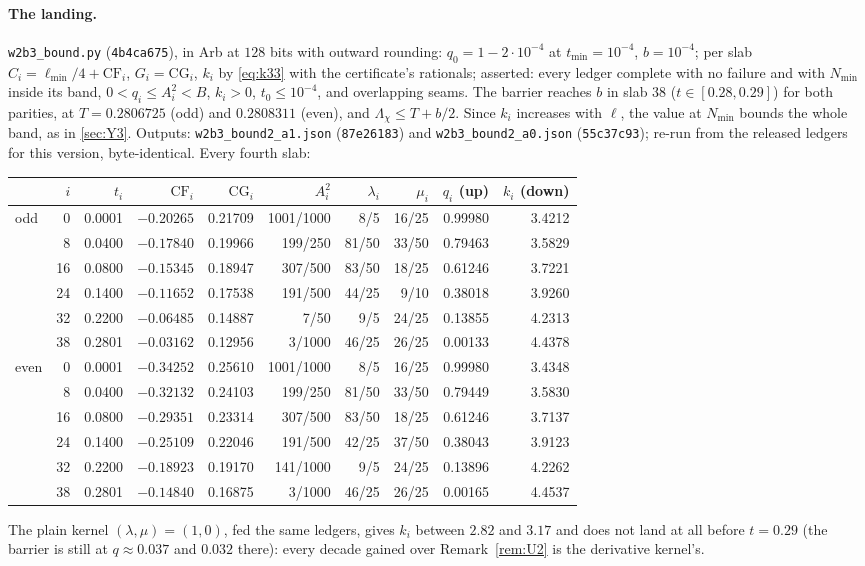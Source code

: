 \documentclass[11pt]{article}
\theoremstyle{definition}
\newcommand{\lean}[1]{\texttt{#1}}
\newcommand{\Lc}{\Lambda}
\begin{document}
\paragraph{The landing.} \lean{w2b3\_bound.py} (\lean{4b4ca675}), in Arb at $128$ bits with outward rounding: $q_0 = 1 - 2\cdot10^{-4}$ at $t_{\min} = 10^{-4}$, $b = 10^{-4}$; per slab $C_i = \ell_{\min}/4 + \mathrm{CF}_i$, $G_i = \mathrm{CG}_i$, $k_i$ by \eqref{eq:k33} with the certificate's rationals; asserted: every ledger complete with no failure and with $N_{\min}$ inside its band, $0 < q_i \le A_i^2 < B$, $k_i > 0$, $t_0 \le 10^{-4}$, and overlapping seams. The barrier reaches $b$ in slab $38$ ($t \in [0.28, 0.29]$) for both parities, at $T = 0.2806725$ (odd) and $0.2808311$ (even), and $\Lc_\chi \le T + b/2$. Since $k_i$ increases with $\ell$, the value at $N_{\min}$ bounds the whole band, as in \cref{sec:Y3}. Outputs: \lean{w2b3\_bound2\_a1.json} (\lean{87e26183}) and \lean{w2b3\_bound2\_a0.json} (\lean{55c37c93}); re-run from the released ledgers for this version, byte-identical. Every fourth slab:
\begin{center}\small
\begin{tabular}{@{}lrrrrrrrrr@{}}
\toprule
& $i$ & $t_i$ & $\mathrm{CF}_i$ & $\mathrm{CG}_i$ & $A_i^2$ & $\lambda_i$ & $\mu_i$ & $q_i$ (up) & $k_i$ (down) \\
\midrule
odd & 0 & 0.0001 & $-0.20265$ & 0.21709 & 1001/1000 & 8/5 & 16/25 & 0.99980 & 3.4212 \\
& 8 & 0.0400 & $-0.17840$ & 0.19966 & 199/250 & 81/50 & 33/50 & 0.79463 & 3.5829 \\
& 16 & 0.0800 & $-0.15345$ & 0.18947 & 307/500 & 83/50 & 18/25 & 0.61246 & 3.7221 \\
& 24 & 0.1400 & $-0.11652$ & 0.17538 & 191/500 & 44/25 & 9/10 & 0.38018 & 3.9260 \\
& 32 & 0.2200 & $-0.06485$ & 0.14887 & 7/50 & 9/5 & 24/25 & 0.13855 & 4.2313 \\
& 38 & 0.2801 & $-0.03162$ & 0.12956 & 3/1000 & 46/25 & 26/25 & 0.00133 & 4.4378 \\
\midrule
even & 0 & 0.0001 & $-0.34252$ & 0.25610 & 1001/1000 & 8/5 & 16/25 & 0.99980 & 3.4348 \\
& 8 & 0.0400 & $-0.32132$ & 0.24103 & 199/250 & 81/50 & 33/50 & 0.79449 & 3.5830 \\
& 16 & 0.0800 & $-0.29351$ & 0.23314 & 307/500 & 83/50 & 18/25 & 0.61246 & 3.7137 \\
& 24 & 0.1400 & $-0.25109$ & 0.22046 & 191/500 & 42/25 & 37/50 & 0.38043 & 3.9123 \\
& 32 & 0.2200 & $-0.18923$ & 0.19170 & 141/1000 & 9/5 & 24/25 & 0.13896 & 4.2262 \\
& 38 & 0.2801 & $-0.14840$ & 0.16875 & 3/1000 & 46/25 & 26/25 & 0.00165 & 4.4537 \\
\bottomrule
\end{tabular}
\end{center}
The plain kernel $(\lambda, \mu) = (1, 0)$, fed the same ledgers, gives $k_i$ between $2.82$ and $3.17$ and does not land at all before $t = 0.29$ (the barrier is still at $q \approx 0.037$ and $0.032$ there): every decade gained over Remark~\ref{rem:U2} is the derivative kernel's.
\end{document}
